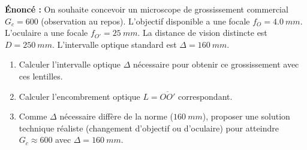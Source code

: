 \documentclass[11pt]{article}
\begin{document}
\begin{exoresolu}
\textbf{Énoncé :} On souhaite concevoir un microscope de grossissement commercial $G_c = 600$ (observation au repos). L'objectif disponible a une focale $f_O = \SI{4,0}{mm}$. L'oculaire a une focale $f_{O'} = \SI{25}{mm}$. La distance de vision distincte est $D = \SI{250}{mm}$. L'intervalle optique standard est $\Delta = \SI{160}{mm}$.
\begin{enumerate}
    \item Calculer l'intervalle optique $\Delta$ nécessaire pour obtenir ce grossissement avec ces lentilles.
    \item Calculer l'encombrement optique $L = \overline{OO'}$ correspondant.
    \item Comme $\Delta$ nécessaire diffère de la norme ($\SI{160}{mm}$), proposer une solution technique réaliste (changement d'objectif ou d'oculaire) pour atteindre $G_c \approx 600$ avec $\Delta = \SI{160}{mm}$.
\end{enumerate}


\end{exoresolu}
\end{document}
